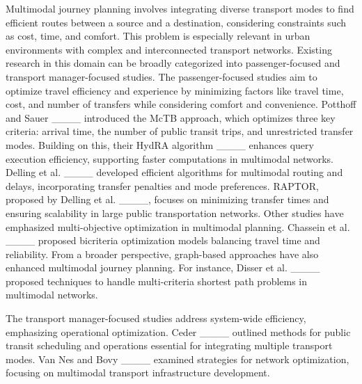 Multimodal journey planning involves integrating diverse transport modes to find efficient routes between a source and a destination, considering constraints such as cost, time, and comfort. This problem is especially relevant in urban environments with complex and interconnected transport networks. Existing research in this domain can be broadly categorized into passenger-focused and transport manager-focused studies.  
The passenger-focused studies aim to optimize travel efficiency and experience by minimizing factors like travel time, cost, and number of transfers while considering comfort and convenience. Potthoff and Sauer ____ introduced the McTB approach, which optimizes three key criteria: arrival time, the number of public transit trips, and unrestricted transfer modes. Building on this, their HydRA algorithm ____ enhances query execution efficiency, supporting faster computations in multimodal networks. Delling et al. ____ developed efficient algorithms for multimodal routing and delays, incorporating transfer penalties and mode preferences. RAPTOR, proposed by Delling et al. ____, focuses on minimizing transfer times and ensuring scalability in large public transportation networks. Other studies have emphasized multi-objective optimization in multimodal planning. Chassein et al. ____ proposed bicriteria optimization models balancing travel time and reliability. From a broader perspective, graph-based approaches have also enhanced multimodal journey planning. For instance, Disser et al. ____ proposed techniques to handle multi-criteria shortest path problems in multimodal networks. 

The transport manager-focused studies address system-wide efficiency, emphasizing operational optimization. Ceder ____ outlined methods for public transit scheduling and operations essential for integrating multiple transport modes. Van Nes and Bovy ____ examined strategies for network optimization, focusing on multimodal transport infrastructure development.
